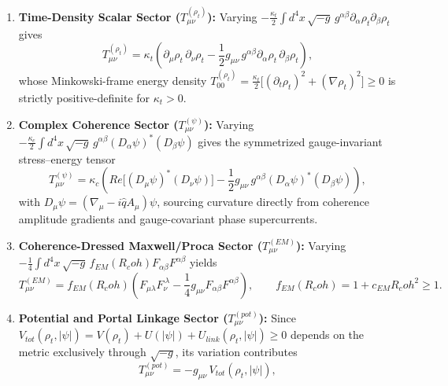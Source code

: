 \documentclass[american,11pt,letterpaper]{article}
\newcommand{\Rcoh}{R_{\mathrm{coh}}}
\def\mathrm#1{#1}%
\def\Rcoh{R_coh}%
\begin{document}
\begin{enumerate}[leftmargin=2em]
  \item \textbf{Time-Density Scalar Sector ($T_{\mu\nu}^{(\rho_t)}$):} Varying $-\frac{\kappa_t}{2}\int d^4x\,\sqrt{-g}\,g^{\alpha\beta}\partial_\alpha\rho_t\partial_\beta\rho_t$ gives
  \begin{equation}
  T_{\mu\nu}^{(\rho_t)}
  = \kappa_t\left(\partial_\mu\rho_t\,\partial_\nu\rho_t - \frac{1}{2}g_{\mu\nu}\,g^{\alpha\beta}\partial_\alpha\rho_t\,\partial_\beta\rho_t\right),
  \label{eq:T_rhot_sec4}
  \end{equation}
  whose Minkowski-frame energy density $T_{00}^{(\rho_t)} = \frac{\kappa_t}{2}\bigl[(\partial_t\rho_t)^2 + (\nabla\rho_t)^2\bigr] \ge 0$ is strictly positive-definite for $\kappa_t > 0$.
  \item \textbf{Complex Coherence Sector ($T_{\mu\nu}^{(\psi)}$):} Varying $-\frac{\kappa_c}{2}\int d^4x\,\sqrt{-g}\,g^{\alpha\beta}(D_\alpha\psi)^*(D_\beta\psi)$ gives the symmetrized gauge-invariant stress--energy tensor
  \begin{equation}
  T_{\mu\nu}^{(\psi)}
  = \kappa_c\left(\mathrm{Re}\bigl[(D_\mu\psi)^*(D_\nu\psi)\bigr] - \frac{1}{2}g_{\mu\nu}\,g^{\alpha\beta}(D_\alpha\psi)^*(D_\beta\psi)\right),
  \label{eq:T_psi_sec4}
  \end{equation}
  with $D_\mu\psi = (\nabla_\mu - i\hat{q}A_\mu)\psi$, sourcing curvature directly from coherence amplitude gradients and gauge-covariant phase supercurrents.
  \item \textbf{Coherence-Dressed Maxwell/Proca Sector ($T_{\mu\nu}^{(\mathrm{EM})}$):} Varying $-\frac{1}{4}\int d^4x\,\sqrt{-g}\,f_{\mathrm{EM}}(\Rcoh)F_{\alpha\beta}F^{\alpha\beta}$ yields
  \begin{equation}
  T_{\mu\nu}^{(\mathrm{EM})}
  = f_{\mathrm{EM}}(\Rcoh)\left(F_{\mu\lambda}F_\nu^{\ \lambda} - \frac{1}{4}g_{\mu\nu}F_{\alpha\beta}F^{\alpha\beta}\right),
  \qquad
  f_{\mathrm{EM}}(\Rcoh) = 1 + c_{\mathrm{EM}}\Rcoh^2 \ge 1.
  \label{eq:T_EM_sec4}
  \end{equation}
  \item \textbf{Potential and Portal Linkage Sector ($T_{\mu\nu}^{(\mathrm{pot})}$):} Since $V_{\mathrm{tot}}(\rho_t, |\psi|) = V(\rho_t) + U(|\psi|) + U_{\mathrm{link}}(\rho_t,|\psi|) \ge 0$ depends on the metric exclusively through $\sqrt{-g}$, its variation contributes
  \begin{equation}
  T_{\mu\nu}^{(\mathrm{pot})} = -g_{\mu\nu}\,V_{\mathrm{tot}}(\rho_t, |\psi|),
  \label{eq:T_pot_sec4}
  \end{equation}

\end{enumerate}
\end{document}
